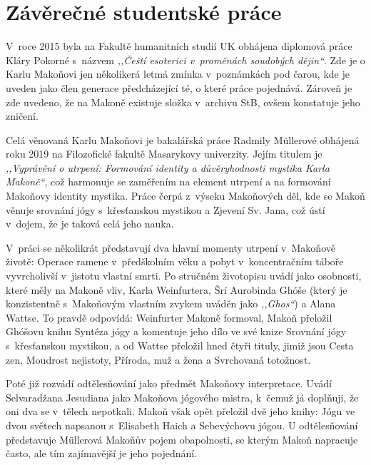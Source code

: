 \section{Závěrečné studentské práce}

V~roce 2015 byla na Fakultě humanitních studií UK obhájena diplomová práce Kláry
Pokorné s~názvem \textit{,,Čeští esoterici v~proměnách soudobých dějin``}\cite{pokorna2015cesti}. Zde
je o Karlu Makoňovi jen několikerá letmá zmínka v~poznámkách pod čarou, kde je
uveden jako člen generace předcházející té, o které práce pojednává. Zároveň je
zde uvedeno, že na Makoně existuje složka v~archivu StB, ovšem konstatuje jeho
zničení.

Celá věnovaná Karlu Makoňovi je bakalářská práce Radmily Müllerové\cite{mullerova2019vypraveni} obhájená roku
2019 na Filozofické fakultě Masarykovy univerzity. Jejím titulem je
\textit{,,Vyprávění o utrpení: Formování identity a důvěryhodnosti mystika Karla
Makoně``}, což harmonuje se zaměřením na element utrpení a na formování Makoňovy
identity mystika. Práce čerpá z~výseku Makoňových děl, kde se Makoň věnuje
srovnání jógy s~křesťanskou mystikou a Zjevení Sv. Jana, což ústí v~dojem, že je
taková celá jeho nauka.

V~práci se několikrát představují dva hlavní momenty utrpení v~Makoňově životě:
Operace ramene v~předškolním věku a pobyt v~koncentračním táboře vyvrcholivší
v~jistotu vlastní smrti. Po stručném životopisu uvádí jako osobnosti, které měly
na Makoně vliv, Karla Weinfurtera, Šrí Aurobinda Ghóše (který je konzistentně
s~Makoňovým vlastním zvykem uváděn jako \textit{,,Ghos``}) a Alana Wattse.
To pravdě odpovídá: Weinfurter Makoně formoval, Makoň přeložil Ghóšovu knihu Syntéza
jógy\cite{aurobindo1999synthesis} a komentuje jeho dílo ve své knize Srovnání
  jógy s~křesťanskou mystikou\cite{KaMaGhos}, a od Wattse přeložil hned čtyři
  tituly, jimiž jsou Cesta
zen\cite{watts1957way}, Moudrost nejistoty\cite{watts1951wisdom}, Příroda, muž a
žena\cite{watts1973nature} a Svrchovaná totožnost\cite{watts1950supreme}.

Poté již rozvádí odtělesňování jako předmět Makoňovy interpretace. Uvádí
Selvaradžana Jesudiana jako Makoňova jógového mistra, k~čemuž já doplňuji, že
oni dva se v~tělech nepotkali. Makoň však opět přeložil dvě jeho knihy: Jógu ve
dvou světech napsanou s~Elisabeth Haich\cite{yesudian1951yoga} a Sebevýchovu
jógou\cite{yesudian1974self}. U odtělesňování představuje Müllerová Makoňův pojem
obapolnosti, se kterým Makoň napracuje často, ale tím zajímavější je jeho
pojednání.

